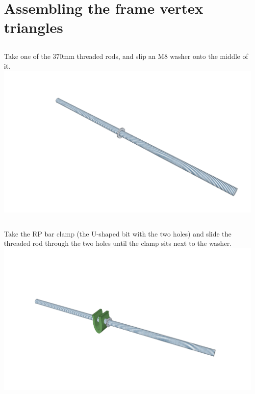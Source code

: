 \chapter{Assembling the frame vertex triangles}
	\section{}
	Take one of the 370mm threaded rods, and slip an M8 washer onto the middle of
	it. \\
	\includegraphics[width=1\linewidth]{graphics/ch1_1.png}
	
	\section{}
	Take the RP bar clamp (the U-shaped bit with the two holes) and slide the threaded rod through the two
	holes until the clamp sits next to the washer. \\
	\includegraphics[width=1\linewidth]{graphics/ch1_2.png}
	
